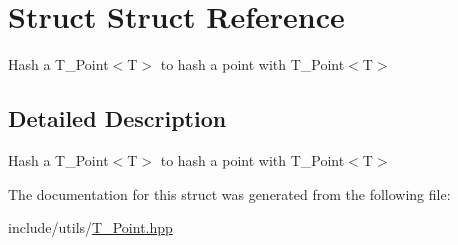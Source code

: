 \hypertarget{structStruct}{}\section{Struct Struct Reference}
\label{structStruct}


Hash a T_Point$<$\+T$>$ to hash a point with T_Point$<$\+T$>$




\subsection{Detailed Description}
Hash a T_Point$<$\+T$>$ to hash a point with T_Point$<$\+T$>$

The documentation for this struct was generated from the following file\+:\begin{DoxyCompactItemize}
\item 
include/utils/\hyperlink{Point_8hpp}{T_Point.\+hpp}\end{DoxyCompactItemize}
